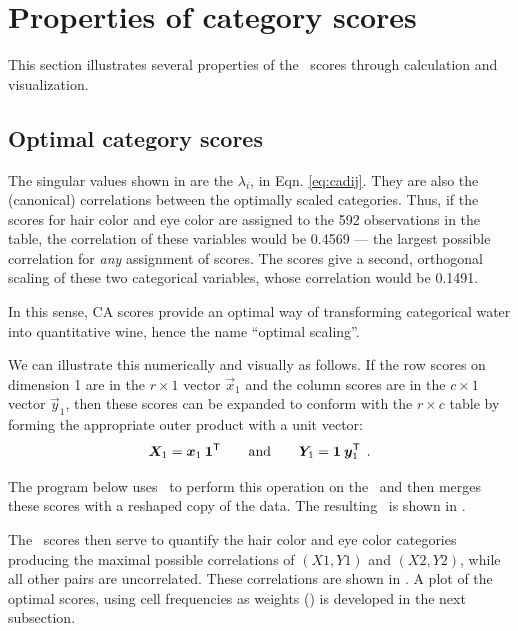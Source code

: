 \section{Properties of category scores}
This section illustrates several properties of the \CA\
scores through calculation and visualization.

\subsection{Optimal category scores}\label{sec:scores}
The singular values shown in  are the \(\lambda_i\), in Eqn. \eqref{eq:cadij}.  They are also the
(canonical) correlations between the optimally scaled categories.
Thus, if the \pname{DIM1} scores for hair color and eye color are assigned to
the 592 observations in the table, the correlation of these variables
would be 0.4569 --- the largest possible correlation for \emph{any}
assignment of scores.
The  scores give a second, orthogonal scaling
of these two categorical variables, whose correlation would be
0.1491.

In this sense, CA scores provide an optimal way of transforming
categorical water into quantitative wine,  hence the name ``optimal
scaling''.

We can illustrate this numerically and visually
as follows. If the row scores on dimension 1 are
in the $r \times 1$ vector $\vec{x}_1$ and the column scores are in the
$c \times 1$ vector $\vec{y}_1$, then these scores can be expanded to
conform with the $r \times c$ table by forming the appropriate outer
product with a unit vector:
\begin{equation*}
 \bm{X}_1 = \bm{x}_1 \: \bm{1}^\mathsf{T}
 \qquad \mbox{and} \qquad
 \bm{Y}_1 = \bm{1} \: \bm{y}_1^\mathsf{T}
 \:\: .
\end{equation*}

The program below uses \IML\ to perform this operation on the 
\Dset\ and then merges these scores with a reshaped copy of the
 data.
The resulting \Dset\ is shown in .

The \CA\ scores then serve to quantify the hair color and eye color
categories producing the maximal possible correlations of $(X1, Y1)$ and
$(X2, Y2)$, while all other pairs are uncorrelated.
These correlations are shown in .
A plot of the optimal scores, using cell frequencies as weights
() is developed in the next subsection.


